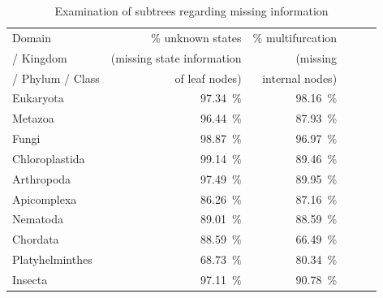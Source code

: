       \begin{table} [h]
        \begin{center}
          \begin{tabular}{ |l|r|r||r|r|r| }
            \hline
            Domain  & \% unknown states & \% multifurcation \\ 
            / Kingdom  & (missing state information & (missing \\
            / Phylum / Class & of leaf nodes) & internal nodes) \\
            \hline \hline
            Eukaryota       & 97.34~\%  & 98.16~\% \\
            \hline \hline
            Metazoa         & 96.44~\%  & 87.93~\% \\ \hline
            Fungi           & 98.87~\%  & 96.97~\% \\ \hline
            Chloroplastida  & 99.14~\%  & 89.46~\% \\
            \hline \hline            
            Arthropoda      & 97.49~\%  & 89.95~\% \\ \hline
            Apicomplexa     & 86.26~\%  & 87.16~\% \\ \hline
            Nematoda        & 89.01~\%  & 88.59~\% \\ \hline
            Chordata        & 88.59~\%  & \cellcolor{green!50}66.49~\% \\ \hline
            Platyhelminthes & \cellcolor{green!50}68.73~\%  & 80.34~\% \\
            \hline \hline            
            Insecta         & 97.11~\%  & 90.78~\% \\
            \hline  
          \end{tabular}
        \end{center}
        \caption{Examination of subtrees regarding missing information}
        \label{table:percentage loss information subtrees} 
      \end{table}

